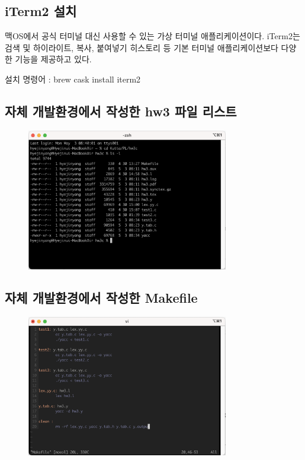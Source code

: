 \documentclass{article}
\begin{document}
\subsection{iTerm2 설치}
맥OS에서 공식 터미널 대신 사용할 수 있는 가상 터미널 애플리케이션이다.
iTerm2는 검색 및 하이라이트, 복사, 붙여넣기 히스토리 등
기본 터미널 애플리케이션보다 다양한 기능을 제공하고 있다.

\vspace{3mm}
\noindent
설치 명령어 : 
brew cask install iterm2

\subsection{자체 개발환경에서 작성한 hw3 파일 리스트}
\begin{figure}[!htbp]
	\begin{center}
		\includegraphics[width=250pt]{hw3_file_list.png}
	\end{center}
\end{figure}

\subsection{자체 개발환경에서 작성한 Makefile}
\begin{figure}[!htbp]
	\begin{center}
		\includegraphics[width=250pt]{hw3_makefile.png}
	\end{center}
\end{figure}
\end{document}
